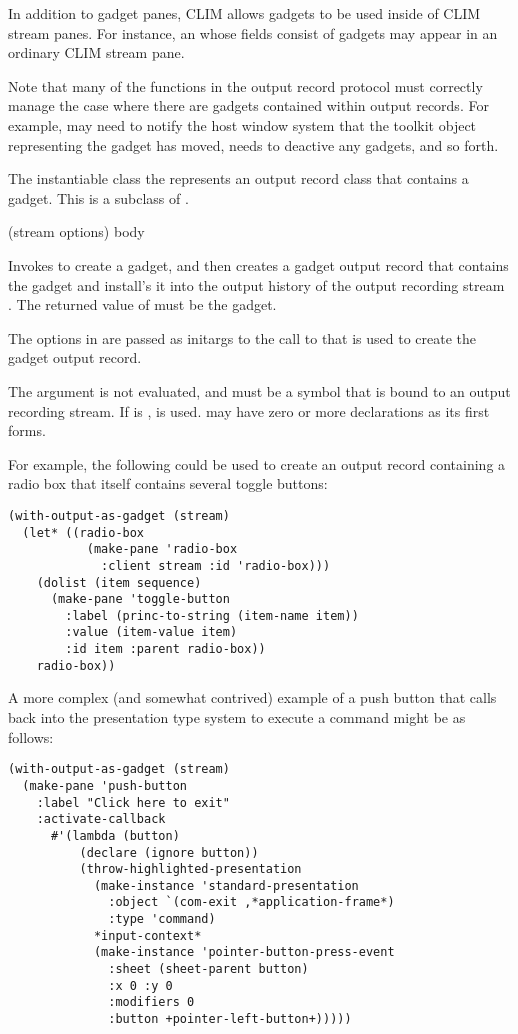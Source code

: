In addition to gadget panes, CLIM allows gadgets to be used inside of CLIM
stream panes.  For instance, an  whose fields consist of
gadgets may appear in an ordinary CLIM stream pane.

Note that many of the functions in the output record protocol must correctly
manage the case where there are gadgets contained within output records.  For
example,  may need to notify the host window
system that the toolkit object representing the gadget has moved,
 needs to deactive any gadgets, and so forth.


The instantiable class the represents an output record class that contains a
gadget.  This is a subclass of .

 {(stream \rest options) \body body} 

Invokes  to create a gadget, and then creates a gadget output record
that contains the gadget and install's it into the output history of the output
recording stream .  The returned value of  must be the
gadget.

The options in  are passed as initargs to the call to
 that is used to create the gadget output
record.

The  argument is not evaluated, and must be a symbol that is bound to
an output recording stream.  If  is ,  is
used.   may have zero or more declarations as its first forms.

For example, the following could be used to create an output record containing a
radio box that itself contains several toggle buttons:

\begin{verbatim}
(with-output-as-gadget (stream)
  (let* ((radio-box
           (make-pane 'radio-box 
             :client stream :id 'radio-box)))
    (dolist (item sequence)
      (make-pane 'toggle-button 
        :label (princ-to-string (item-name item))
        :value (item-value item)
        :id item :parent radio-box))
    radio-box))
\end{verbatim}

A more complex (and somewhat contrived) example of a push button that calls back
into the presentation type system to execute a command might be as follows:

\begin{verbatim}
(with-output-as-gadget (stream)
  (make-pane 'push-button
    :label "Click here to exit"
    :activate-callback
      #'(lambda (button)
          (declare (ignore button))
          (throw-highlighted-presentation
            (make-instance 'standard-presentation
              :object `(com-exit ,*application-frame*)
              :type 'command)
            *input-context*
            (make-instance 'pointer-button-press-event
              :sheet (sheet-parent button)
              :x 0 :y 0
              :modifiers 0
              :button +pointer-left-button+)))))
\end{verbatim}
